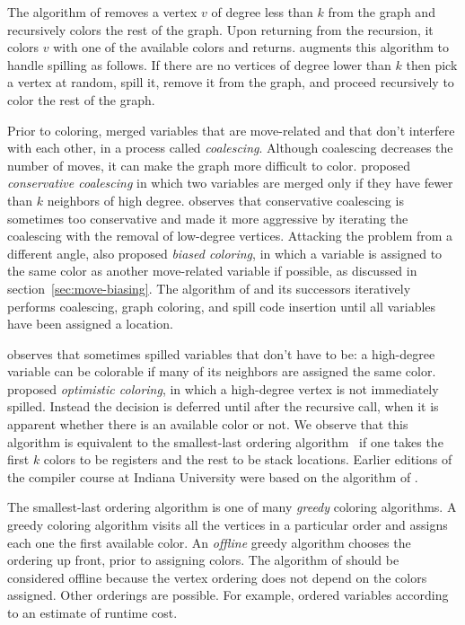 \documentclass[7x10]{TimesAPriori_MIT}%
\numberwithin{theorem}{chapter}
\numberwithin{definition}{chapter}
\numberwithin{equation}{chapter}
\begin{document}
The algorithm of \citet{Chaitin:1981vl} removes a vertex $v$ of degree
less than $k$ from the graph and recursively colors the rest of the
graph. Upon returning from the recursion, it colors $v$ with one of
the available colors and returns.  \citet{Chaitin:1982vn} augments
this algorithm to handle spilling as follows. If there are no vertices
of degree lower than $k$ then pick a vertex at random, spill it,
remove it from the graph, and proceed recursively to color the rest of
the graph.

Prior to coloring, \citet{Chaitin:1981vl} merged variables that are
move-related and that don't interfere with each other, in a process
called \emph{coalescing}. Although coalescing decreases the number of
moves, it can make the graph more difficult to
color. \citet{Briggs:1994kx} proposed \emph{conservative coalescing} in
which two variables are merged only if they have fewer than $k$
neighbors of high degree. \citet{George:1996aa} observes that
conservative coalescing is sometimes too conservative and made it more
aggressive by iterating the coalescing with the removal of low-degree
vertices.
%
Attacking the problem from a different angle, \citet{Briggs:1994kx}
also proposed \emph{biased coloring}, in which a variable is assigned to
the same color as another move-related variable if possible, as
discussed in section~\ref{sec:move-biasing}.
%
The algorithm of \citet{Chaitin:1981vl} and its successors iteratively
performs coalescing, graph coloring, and spill code insertion until
all variables have been assigned a location.

\citet{Briggs:1994kx} observes that \citet{Chaitin:1982vn} sometimes
spilled variables that don't have to be: a high-degree variable can be
colorable if many of its neighbors are assigned the same color.
\citet{Briggs:1994kx} proposed \emph{optimistic coloring}, in which a
high-degree vertex is not immediately spilled. Instead the decision is
deferred until after the recursive call, when it is apparent whether
there is an available color or not. We observe that this algorithm is
equivalent to the smallest-last ordering
algorithm~\citep{Matula:1972aa} if one takes the first $k$ colors to
be registers and the rest to be stack locations.
Earlier editions of the compiler course at Indiana University
\citep{Dybvig:2010aa} were based on the algorithm of
\citet{Briggs:1994kx}.

The smallest-last ordering algorithm is one of many \emph{greedy}
coloring algorithms. A greedy coloring algorithm visits all the
vertices in a particular order and assigns each one the first
available color. An \emph{offline} greedy algorithm chooses the
ordering up front, prior to assigning colors. The algorithm of
\citet{Chaitin:1981vl} should be considered offline because the vertex
ordering does not depend on the colors assigned.  Other orderings are
possible. For example, \citet{Chow:1984ys} ordered variables according
to an estimate of runtime cost.
\end{document}
